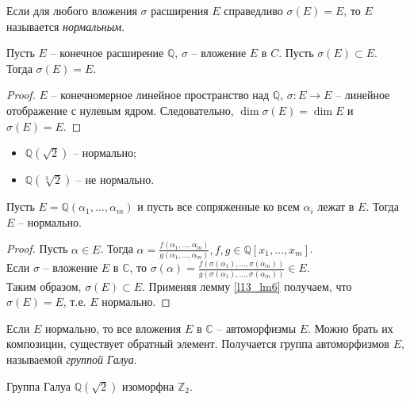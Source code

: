 \begin{definition}
	Если для любого вложения $\sigma$ расширения $E$ справедливо $\sigma(E) = E$, то $E$ называется \textit{нормальным}.
\end{definition}

\begin{lemma} \label{l13_lm6}
	Пусть $E$ -- конечное расширение $\mathbb{Q}$, $\sigma$ -- вложение $E$ в $C$. Пусть $\sigma(E) \subset E$. Тогда $\sigma(E) = E$.
\end{lemma}

\begin{proof}
	$E$ -- конечномерное линейное пространство над $\mathbb{Q}$, $\sigma: E \rightarrow E$ -- линейное отображение с нулевым ядром. Следовательно, $\dim \sigma(E) = \dim E$ и $\sigma(E) = E$.
\end{proof}

\begin{example}
	\begin{itemize}
		\item $\mathbb{Q}(\sqrt{2})$ -- нормально;
		\item $\mathbb{Q}(\sqrt[3]{2})$ -- не нормально.
	\end{itemize}	
\end{example}

\begin{theorem} \label{l13_th8}
	Пусть $E = \mathbb{Q}(\alpha_1, \ldots, \alpha_m)$ и пусть все сопряженные ко всем $\alpha_i$ лежат в $E$. Тогда $E$ -- нормально.
\end{theorem}
\begin{proof}
	Пусть $\alpha \in E$. Тогда $\alpha = \frac{f(\alpha_1, \ldots, \alpha_m)}{g(\alpha_1, \ldots, \alpha_m)}, f, g \in \mathbb{Q}[x_1, \ldots, x_m]$.\\
	Если $\sigma$ -- вложение $E$ в $\mathbb{C}$, то $\sigma(\alpha) = \frac{f(\sigma(\alpha_1), \ldots, \sigma(\alpha_m))}{g(\sigma(\alpha_1), \ldots, \sigma(\alpha_m))} \in E$.\\
	Таким образом, $\sigma(E) \subset E$. Применяя лемму \ref{l13_lm6} получаем, что $\sigma(E) = E$, т.е. $E$ нормально. 
\end{proof}

Если $E$ нормально, то все вложения $E$ в $\mathbb{C}$ -- автоморфизмы $E$. Можно брать их композиции, существует обратный элемент. Получается группа автоморфизмов $E$, называемой \textit{группой Галуа}.
\begin{example}
	Группа Галуа $\mathbb{Q}(\sqrt{2})$ изоморфна $\mathbb{Z}_2$.
\end{example}


